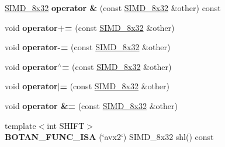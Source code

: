 \begin{DoxyCompactItemize}
\item 
\mbox{\label{class_botan_1_1_s_i_m_d__8x32_a4dcf3f6702991da98f439c843a2794b2}} 
\mbox{\hyperlink{class_botan_1_1_s_i_m_d__8x32}{S\+I\+M\+D\+\_\+8x32}} {\bfseries operator \&} (const \mbox{\hyperlink{class_botan_1_1_s_i_m_d__8x32}{S\+I\+M\+D\+\_\+8x32}} \&other) const
\item 
\mbox{\label{class_botan_1_1_s_i_m_d__8x32_ab253682398dbf3872fd3f6782f892475}} 
void {\bfseries operator+=} (const \mbox{\hyperlink{class_botan_1_1_s_i_m_d__8x32}{S\+I\+M\+D\+\_\+8x32}} \&other)
\item 
\mbox{\label{class_botan_1_1_s_i_m_d__8x32_aa91439d8533e9af82795d1bfb0dac81e}} 
void {\bfseries operator-\/=} (const \mbox{\hyperlink{class_botan_1_1_s_i_m_d__8x32}{S\+I\+M\+D\+\_\+8x32}} \&other)
\item 
\mbox{\label{class_botan_1_1_s_i_m_d__8x32_a550daffcd2e489512485d8cf6fc8966f}} 
void {\bfseries operator$^\wedge$=} (const \mbox{\hyperlink{class_botan_1_1_s_i_m_d__8x32}{S\+I\+M\+D\+\_\+8x32}} \&other)
\item 
\mbox{\label{class_botan_1_1_s_i_m_d__8x32_a6a93165cbd842125aaa73fd465d1ed99}} 
void {\bfseries operator$\vert$=} (const \mbox{\hyperlink{class_botan_1_1_s_i_m_d__8x32}{S\+I\+M\+D\+\_\+8x32}} \&other)
\item 
\mbox{\label{class_botan_1_1_s_i_m_d__8x32_a7b7bf602b8b3df480629dbda030d06fd}} 
void {\bfseries operator \&=} (const \mbox{\hyperlink{class_botan_1_1_s_i_m_d__8x32}{S\+I\+M\+D\+\_\+8x32}} \&other)
\item 
\mbox{\label{class_botan_1_1_s_i_m_d__8x32_aa0167b558141a3de94616c2f942482f7}} 
{\footnotesize template$<$int S\+H\+I\+FT$>$ }\\{\bfseries B\+O\+T\+A\+N\+\_\+\+F\+U\+N\+C\+\_\+\+I\+SA} (\char`\"{}avx2\char`\"{}) S\+I\+M\+D\+\_\+8x32 shl() const
\item 
\mbox{\label{class_botan_1_1_s_i_m_d__8x32_a32abcff4e07ba81c7eb9193a355fc997}} 

\end{DoxyCompactItemize}
